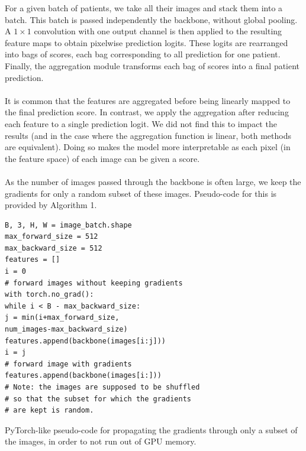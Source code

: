 \documentclass[final]{cvpr}
\begin{document}
	\noindent
	For a given batch of patients, we take all their images and stack them into a batch.
	This batch is passed independently the backbone, without global pooling. 
	A $1\times 1$ convolution with one output channel is then applied to the resulting feature maps to obtain pixelwise prediction logits.
	These logits are rearranged into bags of scores, each bag corresponding to all  prediction for one patient.
	Finally, the aggregation module transforms each bag of scores into a final patient prediction.\\
	\\
	It is common that the features are aggregated before being linearly mapped to the final prediction score.
	In contrast, we apply the aggregation after reducing each feature to a single prediction logit. We did not find this to impact the results (and in the case where the aggregation function is linear, both methods are equivalent). Doing so makes the model more interpretable as each pixel (in the feature space) of each image can be given a score. \\
	\\
	As the number of images passed through the backbone is often large, we keep the gradients for only a random subset of these images. Pseudo-code for this is provided by Algorithm 1.
	
	\begin{table}[h]
		\renewcommand\tablename{Pseudo-code}
		\begin{Verbatim}[fontsize=\footnotesize, samepage=true, frame=single]
B, 3, H, W = image_batch.shape
max_forward_size = 512
max_backward_size = 512
features = []
i = 0
# forward images without keeping gradients
with torch.no_grad():
while i < B - max_backward_size:
j = min(i+max_forward_size,
num_images-max_backward_size)
features.append(backbone(images[i:j]))
i = j
# forward image with gradients
features.append(backbone(images[i:]))
# Note: the images are supposed to be shuffled
# so that the subset for which the gradients
# are kept is random.
		\end{Verbatim}
		\caption{PyTorch-like pseudo-code for propagating the gradients through only a subset of the images, in order to not run out of GPU memory.}
		\label{alg1}
	\end{table}
	
\end{document}
